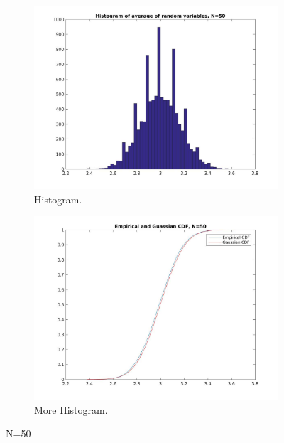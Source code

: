 \documentclass[12pt]{article}
\begin{document}
\begin{figure}[h!]
  \centering
  \begin{subfigure}[b]{0.4\linewidth}
    \includegraphics[width=\linewidth]{jpgs/histograms/50_hist.jpg}
    \caption{Histogram.}
  \end{subfigure}
  \begin{subfigure}[b]{0.4\linewidth}
    \includegraphics[width=\linewidth]{jpgs/cdfs/50_cdf.jpg}
    \caption{More Histogram.}
  \end{subfigure}
  \caption{N=50}
\end{figure}
\end{document}
